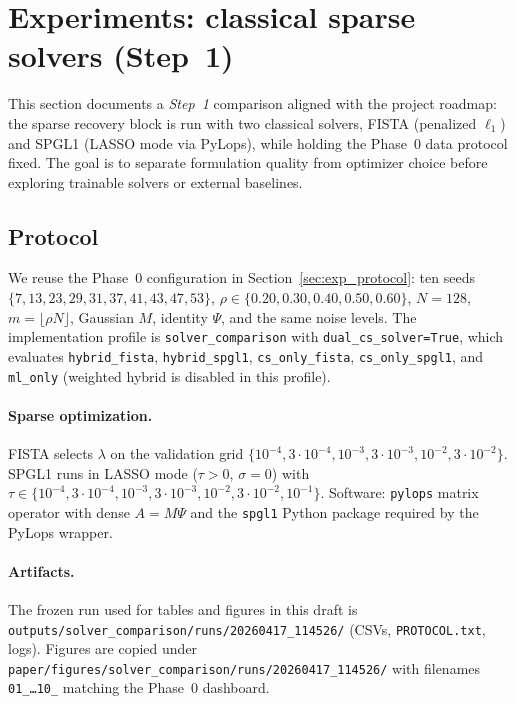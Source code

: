 
\section{Experiments: classical sparse solvers (Step~1)}
\label{sec:exp_solver_etapa1}

This section documents a \emph{Step~1} comparison aligned with the project roadmap: the sparse recovery block is run with two classical solvers, FISTA (penalized $\ell_1$) and SPGL1 (LASSO mode via PyLops), while holding the Phase~0 data protocol fixed.
The goal is to separate formulation quality from optimizer choice before exploring trainable solvers or external baselines.

\subsection{Protocol}
\label{sec:solver_protocol}

We reuse the Phase~0 configuration in Section~\ref{sec:exp_protocol}: ten seeds
$\{7,13,23,29,31,37,41,43,47,53\}$, $\rho \in \{0.20,0.30,0.40,0.50,0.60\}$, $N=128$, $m=\lfloor \rho N\rfloor$, Gaussian $M$, identity $\Psi$, and the same noise levels.
The implementation profile is \texttt{solver\_comparison} with \texttt{dual\_cs\_solver=True}, which evaluates
\texttt{hybrid\_fista}, \texttt{hybrid\_spgl1}, \texttt{cs\_only\_fista}, \texttt{cs\_only\_spgl1}, and \texttt{ml\_only} (weighted hybrid is disabled in this profile).

\paragraph{Sparse optimization.}
FISTA selects $\lambda$ on the validation grid
$\{10^{-4},3\!\cdot\!10^{-4},10^{-3},3\!\cdot\!10^{-3},10^{-2},3\!\cdot\!10^{-2}\}$.
SPGL1 runs in LASSO mode ($\tau>0$, $\sigma=0$) with
$\tau \in \{10^{-4},3\!\cdot\!10^{-4},10^{-3},3\!\cdot\!10^{-3},10^{-2},3\!\cdot\!10^{-2},10^{-1}\}$.
Software: \texttt{pylops} matrix operator with dense $A=M\Psi$ and the \texttt{spgl1} Python package required by the PyLops wrapper.

\paragraph{Artifacts.}
The frozen run used for tables and figures in this draft is
\texttt{outputs/solver\_comparison/runs/20260417\_114526/} (CSVs, \texttt{PROTOCOL.txt}, logs).
Figures are copied under \texttt{paper/figures/solver\_comparison/runs/20260417\_114526/} with filenames \texttt{01\_\ldots 10\_} matching the Phase~0 dashboard.

